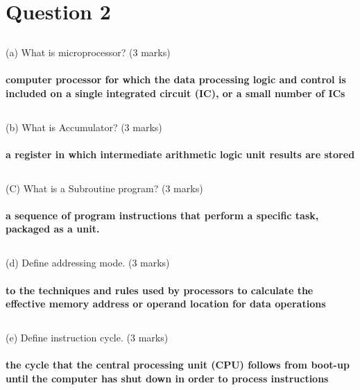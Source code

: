 \documentclass[article]{article}
\begin{document}
\section{Question 2}
\subsection*{}(a) What is microprocessor? (3 marks)
\paragraph{ computer processor for which the data processing logic and control is included on a single integrated circuit (IC), or a small number of ICs}
\subsection*{}(b) What is Accumulator? (3 marks)

\paragraph{a register in which intermediate arithmetic logic unit results are stored}
\subsection*{}(C) What is a Subroutine program? (3 marks)
\paragraph{a sequence of program instructions that perform a specific task, packaged as a unit.}
\subsection*{}(d) Define addressing mode. (3 marks)
\paragraph{ to the techniques and rules used by processors to calculate the effective memory address or operand location for data operations}
\subsection*{}(e) Define instruction cycle. (3 marks)
\paragraph{the cycle that the central processing unit (CPU) follows from boot-up until the computer has shut down in order to process instructions}
\end{document}
